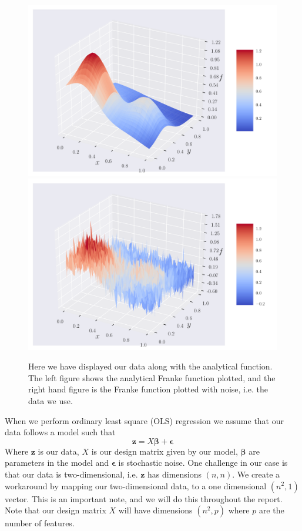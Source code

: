 \documentclass[reprint,english,notitlepage,aps,nobalancelastpage,nofootinbib]{revtex4-1}  %
\newcommand{\vc}[1]{\mathbf{#1}}
\begin{document}
\begin{figure}[!htb]
	\includegraphics[width=\linewidth]{Frank_anal_eps_0.pdf}
	\endminipage\hfill
	\includegraphics[width=\linewidth]{Frank_anal_eps_0_2.pdf}
	\endminipage
	\caption{Here we have displayed our data along with the analytical function. The left figure shows the analytical Franke function plotted, and the right hand figure is the Franke function plotted with noise, i.e. the data we use.}\label{fig:FF_dataset}
\end{figure}

When we perform ordinary least square (OLS) regression we assume that our data follows a model such that
\begin{equation}
	\vc{z} = X \boldsymbol{\beta} + \boldsymbol{\epsilon}
\end{equation}
Where $\vc{z}$ is our data, $X$ is our design matrix given by our model, $\boldsymbol{\beta}$ are parameters in the model and $\boldsymbol{\epsilon}$ is stochastic noise. One challenge in our case is that our data is two-dimensional, i.e. $\vc{z}$ has dimensions $(n,n)$. We create a workaround by mapping our two-dimensional data, to a one dimensional $(n^2,1)$ vector. This is an important note, and we will do this throughout the report. Note that our design matrix $X$ will have dimensions $(n^2,p)$ where $p$ are the number of features.
\end{document}
